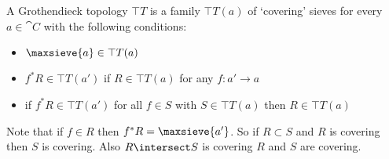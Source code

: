 \begin{definition}

A Grothendieck topology $\top{T}$ is a family $\top{T}(a)$ 
of `covering' sieves for every $a\in \cat{C}$ with the following conditions:

\begin{itemize}
\item  $\maxsieve{a} \in \top{T}(a)$
\item $f^*R\in \top{T}(a')$ if $R\in \top{T}(a)$ 
		for any $f:a'\rightarrow a$
\item if $f^*R\in \top{T}(a')$ for all $f\in S$ 
		with $S\in \top{T}(a)$ then $R\in \top{T}(a)$
\end{itemize}

\end{definition}

\begin{remark}
Note that if $f\in R$ then $f^*R = \maxsieve{a'}$. 
So if $R\subset S$ and $R$ is covering then $S$ is covering. 
Also $R\intersect S$ is covering \iff $R$ and $S$ are covering.
\end{remark}